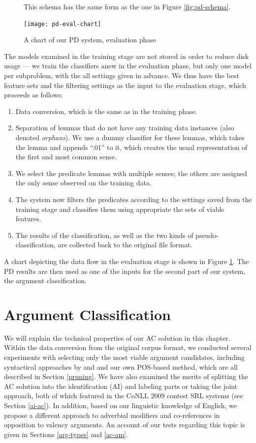 \documentclass[12pt,notitlepage]{report}
\begin{document}
\begin{figure}[htb]
\caption{A chart of our PD system, evaluation phase}\label{fig:pd-eval}
\noindent\footnotesize This schema has the same form as the one in Figure \ref{fig:pd-schema}.
\begin{center}
\texttt{[image: pd-eval-chart]}
\end{center}
\end{figure}

The models examined in the training stage are not stored in order to reduce disk usage --- we train the classifiers anew in the evaluation phase, but only one model per subproblem, with the all settings given in advance. We thus have the best feature sets and the filtering settings as the input to the evaluation stage, which proceeds as follows:
\begin{enumerate}
    \item Data conversion, which is the same as in the training phase.
    \item Separation of lemmas that do not have any training data instances (also denoted \emph{orphans}). We use a dummy classifier for these lemmas, which takes the lemma and appends ``.01'' to it, which creates the usual representation of the first and most common sense.
    \item We select the predicate lemmas with multiple senses; the others are assigned the only sense observed on the training data.
    \item The system now filters the predicates according to the settings saved from the training stage and classifies them using appropriate the sets of viable features.
    \item The results of the classification, as well as the two kinds of pseudo-classification, are collected back to the original file format.
\end{enumerate}
A chart depicting the data flow in the evaluation stage is shown in Figure \ref{fig:pd-eval}. The PD results are then used as one of the inputs for the second part of our system, the argument classification.

%
%
\chapter{Argument Classification}\label{ac}
%
%

We will explain the technical properties of our AC solution in this chapter. Within the data conversion from the original corpus format, we conducted several experiments with selecting only the most viable argument candidates, including syntactical approaches by \citet{zha09} and \citet{asahara09} and our own POS-based method, which are all described in Section \ref{pruning}. We have also examined the merits of splitting the AC solution into the identification (AI) and labeling parts or taking the joint approach, both of which featured in the CoNLL 2009 contest SRL systems (see Section \ref{ai-ac}). In addition, based on our linguistic knowledge of English, we propose a different approach to adverbial modifiers and co-references in opposition to valency arguments. An account of our tests regarding this topic is given in Sections \ref{arg-types} and \ref{ac-am}. 
\end{document}
